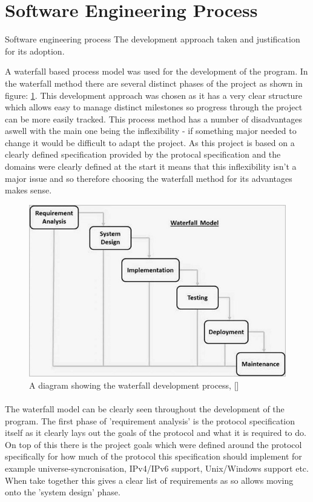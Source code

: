 \documentclass[11pt,a4paper,notitlepage]{report}
\begin{document}
	\section{Software Engineering Process}
		Software
	engineering
	process
	The development approach taken and justification for
	its adoption.

	A waterfall based process model was used for the development of the program. In the waterfall
	method there are several distinct phases of the project as shown in figure: \ref{waterfall-diag}. This 
	development approach was chosen as it has a very clear structure which allows easy to manage distinct milestones 
	so progress through the project can be more easily tracked. This process method has a number of disadvantages aswell
	with the main one being the inflexibility - if something major needed to change it would be difficult to adapt the project. 
	As this project is based on a clearly defined specification provided by the protocal specification and the domains were 
	clearly defined at the start it means that this inflexibility isn't a major issue and so therefore choosing the waterfall 
	method for its advantages makes sense. 
	
	\begin{figure}
		\label{waterfall-diag}
		\includegraphics[width=\textwidth]{sdlc_waterfall_model.jpg}
		\caption{A diagram showing the waterfall development process, [\cite{waterfall-diagram}]}
	\end{figure}

	\paragraph*{}
	The waterfall model can be clearly seen throughout the development of the program. The first phase of 'requirement analysis'
	is the protocol specification itself as it clearly lays out the goals of the protocol and what it is required to do. On top of this
	there is the project goals which were defined around the protocol specifically for how much of the protocol this specification should
	implement for example universe-syncronisation, IPv4/IPv6 support, Unix/Windows support etc. When take together this gives a clear list of
	requirements as so allows moving onto the 'system design' phase.
\end{document}
